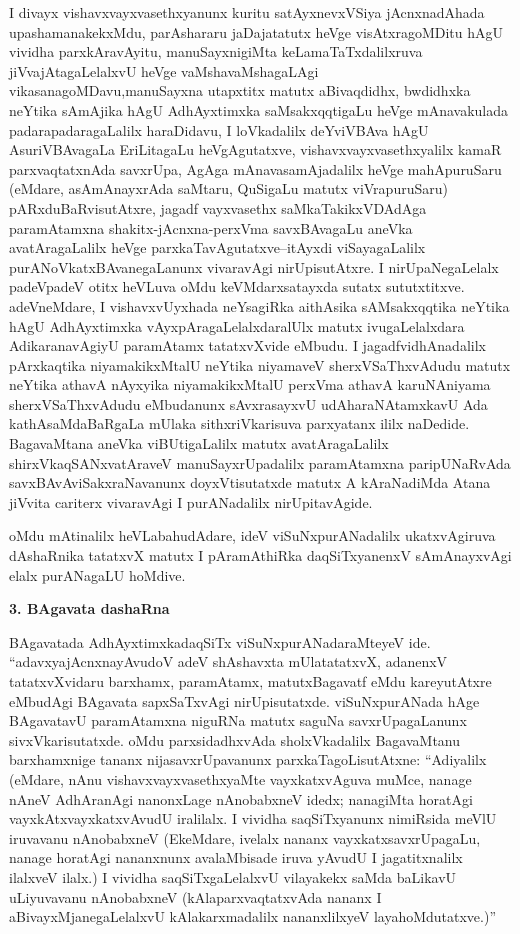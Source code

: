 I divayx vishavxvayxvasethxyanunx kuritu satAyxnevxVSiya jAcnxnadAhada upashamanakekxMdu, parAshararu jaDajatatutx heVge visAtxragoMDitu hAgU vividha parxkAravAyitu, manuSayx\-nigiMta keLamaTaTxdalilxruva jiVvajAtagaLelalxvU heVge vaMshavaMshagaLAgi vikasana\-goMDavu,\break manuSayxna utapxtitx matutx aBivaqdidhx, bwdidhxka neYtika sAmAjika hAgU AdhAyxtimxka saMsakxqqti\-gaLu heVge mAnavakulada padarapadaragaLalilx haraDidavu, I loVkadalilx deYviVBAva hAgU AsuriVBAvagaLa EriLitagaLu heVgAgutatxve, vishavxvayxvasethxyalilx kamaR parxvaqtatx\-nAda savxrUpa, AgAga mAnavasamAjadalilx heVge mahApuruSaru (eMdare, asAmAnayxrAda saMtaru, QuSigaLu matutx viVrapuruSaru) pARxduBaRvisutAtxre, jagadf vayxvasethx saMkaTakikxVDAdAga paramAtamxna shakitx-jAcnxna-perxVma savxBAvagaLu aneVka avatAragaLalilx heVge parxkaTavAgutatxve--itAyxdi viSayagaLalilx purANoVkatxBAvanegaLanunx vivaravAgi nirUpisutAtxre. I nirUpaNegaLelalx padeVpadeV otitx heVLuva oMdu keVMdarxsatayxda sutatx sututxtitxve. adeVneMdare, I vishavxvUyxhada neYsagiRka aithAsika sAMsakxqqtika neYtika hAgU AdhAyxtimxka vAyxpAragaLelalxdaralUlx matutx ivugaLelalxdara AdikaranavAgiyU paramAtamx tatatxvXvide eMbudu. I jagadfvidhAnadalilx pArxkaqtika niyamakikxMtalU neYtika niyamaveV sherxVSaThxvAdudu matutx neYtika athavA nAyxyika niyamakikxMtalU perxVma athavA karuNAniyama sherxVSaThxvAdudu eMbudanunx sAvxrasayxvU udAharaNAtamxkavU Ada kathAsaMdaBaRgaLa mUlaka sithxriVkarisuva parxyatanx ililx naDedide. BagavaMtana aneVka viBUtigaLalilx matutx avatAragaLalilx shirxVkaqSANxvatAraveV manuSayxrUpadalilx paramAtamxna paripUNaRvAda savxBAvAviSakxraNavanunx doyxVtisutatxde matutx A kAraNadiMda Atana jiVvita cariterx vivaravAgi I purANadalilx nirUpitavAgide.

oMdu mAtinalilx heVLabahudAdare, ideV viSuNxpurANadalilx ukatxvAgiruva dAshaRnika tatatxvX matutx I pAramAthiRka daqSiTxyanenxV sAmAnayxvAgi elalx purANagaLU hoMdive.

\bigskip
\begin{center}
{\Large\bf 3. BAgavata dashaRna}
\end{center}

BAgavatada AdhAyxtimxkadaqSiTx viSuNxpurANadaraMteyeV ide. ``adavxyajAcnxna\break \hbox{yAvudoV} adeV shAshavxta mUlatatatxvX, adanenxV tatatxvXvidaru barxhamx, paramAtamx, matutx\break Bagavatf eMdu kareyutAtxre eMbudAgi BAgavata sapxSaTxvAgi nirUpisutatxde. viSuNx\-purANada hAge BAgavatavU paramAtamxna niguRNa matutx saguNa savxrUpagaLanunx sivxVkari\-sutatxde. oMdu parxsidadhxvAda sholxVkadalilx BagavaMtanu barxhamxnige tananx nijasavxrUpavanunx parxkaTa\-goLisutAtxne: ``Adiyalilx (eMdare, nAnu vishavxvayxvasethxyaMte vayxkatxvAguva muMce, nanage nAneV AdhAranAgi nanonxLage nAnobabxneV idedx; nanagiMta horatAgi vayxkAtxvayxkatx\-vAvudU iralilalx. I vividha saqSiTxyanunx nimiRsida meVlU iruvavanu nAnobabxneV (EkeMdare, ivelalx nananx vayxkatxsavxrUpagaLu, nanage horatAgi nananxnunx avalaMbisade iruva yAvudU I jagatitxnalilx ilalxveV ilalx.) I vividha saqSiTxgaLelalxvU vilayakekx saMda baLikavU uLiyuvavanu nAnobabxneV (kAlaparxvaqtatxvAda nananx I aBivayxMjanegaLelalxvU kAlakarxmadalilx nananxlilxyeV layahoMdutatxve.)''

